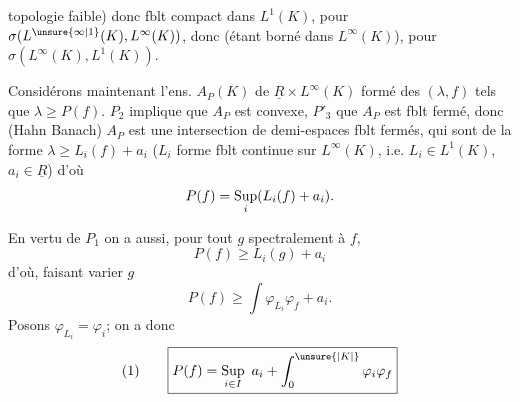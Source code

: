 topologie faible) donc fblt compact dans $L^1(K)$,  
pour $\sigma(L^{\unsure{\infty|1}}(K),L^\infty(K))$, donc (étant borné dans $L^\infty(K)$), pour $\sigma(L^\infty(K),L^1(K))$.


Considérons maintenant l'ens. $A_P(K)$ de $\underline{R}\times L^\infty(K)$ formé des $(\lambda,f)$ tels que $\lambda\geq P(f)$.
$P_2$ implique que $A_P$ est convexe, $P'_3$ que $A_P$ est fblt fermé, donc (Hahn Banach) $A_P$ est une intersection de demi-espaces fblt fermés, qui sont  de la forme $\lambda\geq L_i(f)+a_i$ ($L_i$ forme fblt continue sur $L^\infty(K)$, i.e. $L_i\in L^1(K)$,  $a_i\in\underline{R}$) d'où
\[
P(f)=\mathop{\rm Sup}_i(L_i(f)+a_i).
\]

En vertu de $P_1$ on a  aussi, pour tout $g$  spectralement  à $f$,
\[
P(f)\geq L_i(g)+a_i
\]
d'où,  faisant varier $g$
\[
P(f)\geq\int\varphi_{L_i}\varphi_f+a_i.
\]
Posons $\varphi_{L_i}=\varphi_i$; on a donc
\[
(1)\qquad \boxed{P(f)=\mathop{\rm Sup}_{i\in I}\ a_i+\int_0^{\unsure{|K|}}\varphi_i\varphi_f}
\]
